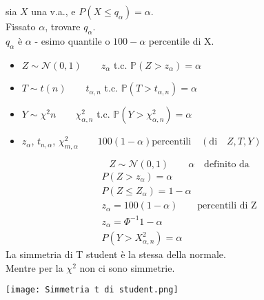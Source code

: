 sia $X$ una v.a., e  $P(X\leq q_\alpha) = \alpha$.
\\Fissato $\alpha$, trovare $q_\alpha$.
\\ $q_\alpha$ è $\alpha$ - esimo quantile o $100 - \alpha$ percentile di X.
\begin{itemize}
    \item $Z \sim \mathcal{N}(0,1) \qquad z_\alpha$ t.c. $\mathbb{P}(Z>z_\alpha) = \alpha$
    \item $T \sim t(n) \qquad t_{\alpha, n}$ t.c. $\mathbb{P}(T>t_{\alpha, n}) = \alpha$
    \item $Y \sim \chi^2{n} \qquad \chi^2_{\alpha, n}$ t.c. $\mathbb{P}(Y>\chi^2_{\alpha,n}) = \alpha$
    \item $z_\alpha$, $t_{n, \alpha}$, $\chi^2_{m, \alpha} 
    \qquad 100(1-\alpha) \text{percentili} \quad (\text{di}\quad Z, T, Y)$
\end{itemize}
\begin{equation*}
    Z \sim \mathcal{N}(0,1) \qquad \alpha \quad \text{definito da}
\end{equation*}
\begin{gather*}
    P(Z>z_\alpha) = \alpha \\
    P(Z\leq Z_\alpha) = 1-\alpha \\
    z_\alpha = 100(1-\alpha) \qquad \text{percentili di Z}\\
    z_\alpha = \Phi^{-1}{1-\alpha} \\
    P(Y > X^2_{\alpha, n}) = \alpha
\end{gather*}
La simmetria di T student è la stessa della normale.
\\ Mentre per la $\chi^2$ non ci sono simmetrie.
\begin{center}
    \texttt{[image: Simmetria t di student.png]}
\end{center}

